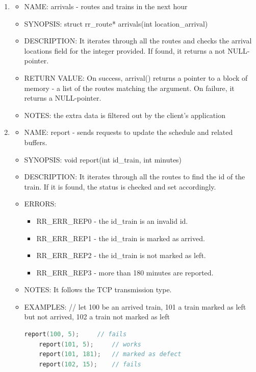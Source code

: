 \documentclass[runningheads]{llncs}
\begin{document}
\begin{enumerate}
   \item \begin{itemize} \item NAME: arrivals - routes and trains in the next hour
            \item SYNOPSIS: struct rr\_route* arrivals(int location\_arrival)
            \item DESCRIPTION: It iterates through  all the routes and checks the arrival locations field for the integer provided. If found, it returns a not NULL-pointer. 
            \item RETURN VALUE: On success, arrival() returns a pointer to a block of memory - a list of the routes matching the argument. On failure, it returns a NULL-pointer.
            \item NOTES: the extra data is filtered out by the client's application
            \vspace{0.3cm}
   \end{itemize}
   
   \item \begin{itemize} \item NAME: report - sends requests to update the schedule and related buffers.
            \item SYNOPSIS: void report(int id\_train, int minutes)  
            \item DESCRIPTION: It iterates through  all the routes to find the id of the train. If it is found, the status is checked and set accordingly.
            \item ERRORS: \begin{itemize}
                \item RR\_ERR\_REP0 - the id\_train is an invalid id. 
                \item RR\_ERR\_REP1 - the id\_train is marked as arrived. 
                \item RR\_ERR\_REP2 - the id\_train is not marked as left.
                \item RR\_ERR\_REP3 - more than 180 minutes are reported.
            \end{itemize}
            \item NOTES: It follows the TCP transmission type.
            \item EXAMPLES: 
    // let 100 be an arrived train, 101 a train marked as left but not arrived, 102 a train not marked as left  
    \begin{lstlisting}[language=C++]
    report(100, 5);     // fails
    report(101, 5);     // works
    report(101, 181);   // marked as defect
    report(102, 15);    // fails
            \end{lstlisting}
            \vspace{0.3cm}
   \end{itemize}
   

\end{enumerate}
\end{document}
